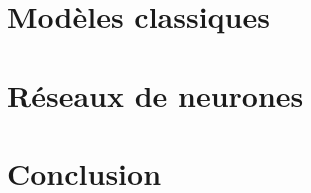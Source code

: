 \documentclass[11pt]{scrartcl} %
\begin{document}
\section{Modèles classiques}

\section{Réseaux de neurones}

\section*{Conclusion}
\end{document}
